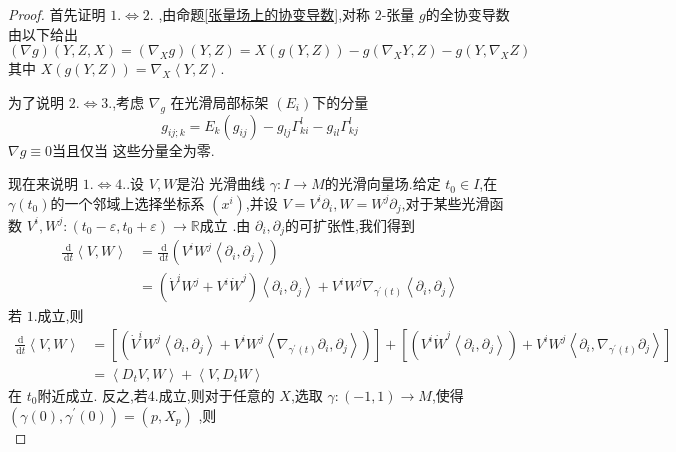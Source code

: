 \documentclass[../../几何与拓扑.tex]{subfiles}
\begin{document}
\begin{proof}
    首先证明 \(  1. \iff 2.  \) ,由命题\ref{张量场上的协变导数},对称 \(  2  \)-张量 \(  g  \)的全协变导数由以下给出 \[
    \left(  \nabla g \right)\left( Y,Z,X \right)= \left(  \nabla _{X}g \right)\left( Y,Z \right)=  X \left( g\left( Y,Z \right)  \right)-g\left(  \nabla _{X}Y,Z \right)-g\left( Y, \nabla _{X}Z \right)       
    \]  其中 \(  X\left( g\left( Y,Z \right)  \right)=  \nabla _{X}\left<Y,Z \right>   \). 

    为了说明 \(  2.\iff 3.  \),考虑 \(   \nabla _{g}  \)  在光滑局部标架 \( \left( E_{i} \right)   \)下的分量 \[
    g_{ij;k}= E_{k}\left( g_{ij} \right)- g_{lj} \Gamma ^{l}_{ki} - g_{il} \Gamma ^{l}_{kj} 
    \] \(   \nabla g \equiv 0  \)当且仅当 这些分量全为零.
    
    现在来说明 \(  1.\iff 4.  \).设 \(  V,W  \)是沿 光滑曲线 \(   \gamma :I\to M  \)的光滑向量场.给定 \(  t_0 \in I  \),在 \(   \gamma \left( t_0 \right)   \)的一个邻域上选择坐标系 \(  \left( x^{i} \right)   \),并设 \(  V =  V^{i}\partial _{i},W =  W^{j}\partial _{j}  \),对于某些光滑函数 \(  V^{i},W^{j}: \left( t_0- \varepsilon ,t_0+  \varepsilon  \right)\to \mathbb{R}    \)成立 .由 \(  \partial _{i},\partial _{j}  \)的可扩张性,我们得到 \[
    \begin{aligned}
    \frac{\,\mathrm{d}  }{\,\mathrm{d} t }\left<V,W \right>& =  \frac{\,\mathrm{d}  }{\,\mathrm{d} t }\left(V^{i}W^{j}\left<\partial _{i},\partial _{j} \right> \right)\\ 
     & = \left( \dot{V}^{i}W^{j}+  V^{i} \dot{W}^{j} \right)\left<\partial _{i},\partial _{j} \right>+     V^{i}W^{j}  \nabla _{  \gamma ^{\prime} \left( t \right) }\left<\partial _{i},\partial _{j} \right> 
    \end{aligned}
    \]      若 \(  1.  \)成立,则 \[
    \begin{aligned}
    \frac{\,\mathrm{d}  }{\,\mathrm{d} t }\left<V,W \right>&=  \left[ \left( \dot{V}^{i}W^{j}\left<\partial _{i},\partial _{j} \right>+ V^{i}W^{j}\left< \nabla _{ \gamma ^{\prime} \left( t \right)}\partial _{i},\partial _{j} \right> \right)  \right]   +  \left[ \left( V^{i}\dot{W}^{j}\left<\partial _{i},\partial _{j} \right> \right)+  V^{i}W^{j}\left<\partial _{i}, \nabla _{ \gamma ^{\prime} \left( t \right) }\partial _{j} \right>  \right]\\ 
     & =  \left<D_{t}V,W \right>+ \left<V,D_{t}W \right>
    \end{aligned}
    \]   在 \(  t_0  \)附近成立.  反之,若4.成立,则对于任意的 \(  X  \),选取 \(   \gamma :\left( -1,1 \right)\to M   \),使得 \(  \left(  \gamma \left( 0 \right), \gamma ^{\prime} \left( 0 \right)   \right)= \left( p,X_{p} \right)     \)   ,则 \[
\]
\end{proof}
\end{document}
